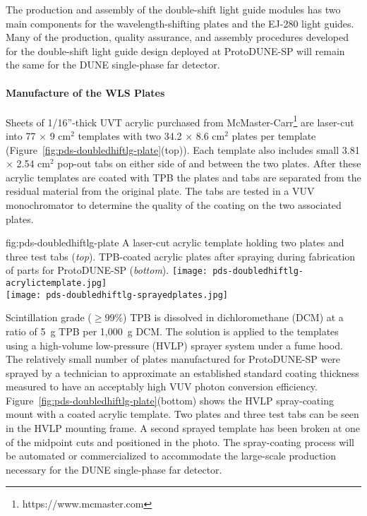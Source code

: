 The production and assembly of the double-shift light guide modules has two main components for the wavelength-shifting plates and the EJ-280 light guides. Many of the production, quality assurance, and assembly procedures developed for the double-shift light guide design deployed at ProtoDUNE-SP will remain the same for the DUNE single-phase far detector.
																								
\paragraph*{Manufacture of the WLS Plates}

Sheets of 1/16''-thick UVT acrylic purchased from McMaster-Carr\footnote{https://www.mcmaster.com} are laser-cut into 77 $\times$ 9 cm$^2$ templates with two 34.2 $\times$ 8.6 cm$^2$ plates per template (Figure~\ref{fig:pds-doubledhiftlg-plate}(top)). Each template also includes small 3.81 $\times$ 2.54 cm$^2$ pop-out tabs on either side of and between the two plates. After these acrylic templates are coated with TPB the plates and tabs are separated from the residual material from the original plate. The tabs are tested in a VUV monochromator to determine the quality of the coating on the two associated plates.

\begin{dunefigure}
{fig:pds-doubledhiftlg-plate}
{A laser-cut acrylic template holding two plates and three test tabs ({\it top}). TPB-coated acrylic plates after spraying during fabrication of parts for ProtoDUNE-SP ({\it bottom}).}
    \texttt{[image: pds-doubledhiftlg-acrylictemplate.jpg]}\\
    \vspace{0.3cm}
    \texttt{[image: pds-doubledhiftlg-sprayedplates.jpg]}
\end{dunefigure}

Scintillation grade ($\ge 99$\%) TPB is dissolved in dichloromethane (DCM) at a ratio of 5~g TPB per 1,000~g DCM. The solution is applied to the templates using a high-volume low-pressure (HVLP) sprayer system under a fume hood. The relatively small number of plates manufactured for ProtoDUNE-SP were sprayed by a technician to approximate an established standard coating thickness measured to have an acceptably high VUV photon conversion efficiency. Figure~\ref{fig:pds-doubledhiftlg-plate}(bottom) shows the HVLP spray-coating mount with a coated acrylic template. Two plates and three test tabs can be seen in the HVLP mounting frame. A second sprayed template has been broken at one of the midpoint cuts and positioned in the photo. The spray-coating process will be automated or commercialized to accommodate the large-scale production necessary for the DUNE single-phase far detector.

